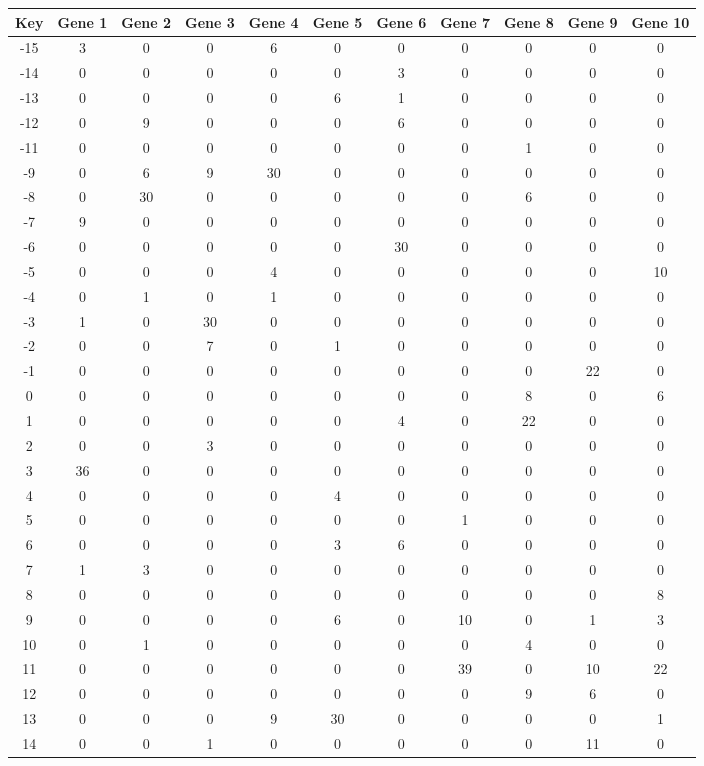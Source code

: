 \begin{tabular}{|c|c|c|c|c|c|c|c|c|c|c|}
\hline
Key & Gene 1 & Gene 2 & Gene 3 & Gene 4 & Gene 5 & Gene 6 & Gene 7 & Gene 8 & Gene 9 & Gene 10 \\
\hline
-15 & 3 & 0 & 0 & 6 & 0 & 0 & 0 & 0 & 0 & 0 \\
-14 & 0 & 0 & 0 & 0 & 0 & 3 & 0 & 0 & 0 & 0 \\
-13 & 0 & 0 & 0 & 0 & 6 & 1 & 0 & 0 & 0 & 0 \\
-12 & 0 & 9 & 0 & 0 & 0 & 6 & 0 & 0 & 0 & 0 \\
-11 & 0 & 0 & 0 & 0 & 0 & 0 & 0 & 1 & 0 & 0 \\
-9 & 0 & 6 & 9 & 30 & 0 & 0 & 0 & 0 & 0 & 0 \\
-8 & 0 & 30 & 0 & 0 & 0 & 0 & 0 & 6 & 0 & 0 \\
-7 & 9 & 0 & 0 & 0 & 0 & 0 & 0 & 0 & 0 & 0 \\
-6 & 0 & 0 & 0 & 0 & 0 & 30 & 0 & 0 & 0 & 0 \\
-5 & 0 & 0 & 0 & 4 & 0 & 0 & 0 & 0 & 0 & 10 \\
-4 & 0 & 1 & 0 & 1 & 0 & 0 & 0 & 0 & 0 & 0 \\
-3 & 1 & 0 & 30 & 0 & 0 & 0 & 0 & 0 & 0 & 0 \\
-2 & 0 & 0 & 7 & 0 & 1 & 0 & 0 & 0 & 0 & 0 \\
-1 & 0 & 0 & 0 & 0 & 0 & 0 & 0 & 0 & 22 & 0 \\
0 & 0 & 0 & 0 & 0 & 0 & 0 & 0 & 8 & 0 & 6 \\
1 & 0 & 0 & 0 & 0 & 0 & 4 & 0 & 22 & 0 & 0 \\
2 & 0 & 0 & 3 & 0 & 0 & 0 & 0 & 0 & 0 & 0 \\
3 & 36 & 0 & 0 & 0 & 0 & 0 & 0 & 0 & 0 & 0 \\
4 & 0 & 0 & 0 & 0 & 4 & 0 & 0 & 0 & 0 & 0 \\
5 & 0 & 0 & 0 & 0 & 0 & 0 & 1 & 0 & 0 & 0 \\
6 & 0 & 0 & 0 & 0 & 3 & 6 & 0 & 0 & 0 & 0 \\
7 & 1 & 3 & 0 & 0 & 0 & 0 & 0 & 0 & 0 & 0 \\
8 & 0 & 0 & 0 & 0 & 0 & 0 & 0 & 0 & 0 & 8 \\
9 & 0 & 0 & 0 & 0 & 6 & 0 & 10 & 0 & 1 & 3 \\
10 & 0 & 1 & 0 & 0 & 0 & 0 & 0 & 4 & 0 & 0 \\
11 & 0 & 0 & 0 & 0 & 0 & 0 & 39 & 0 & 10 & 22 \\
12 & 0 & 0 & 0 & 0 & 0 & 0 & 0 & 9 & 6 & 0 \\
13 & 0 & 0 & 0 & 9 & 30 & 0 & 0 & 0 & 0 & 1 \\
14 & 0 & 0 & 1 & 0 & 0 & 0 & 0 & 0 & 11 & 0 \\
\hline
\end{tabular}